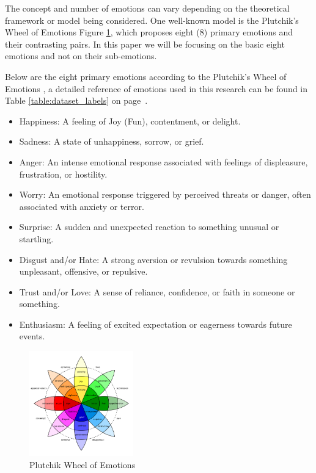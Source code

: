 \documentclass[11pt]{article}
\begin{document}
The concept and number of emotions can vary depending on the theoretical framework or model being considered. One well-known model is the Plutchik's Wheel of Emotions Figure \ref{fig:plutchik-wheel}, which proposes eight (8) primary emotions and their contrasting pairs. In this paper we will be focusing on the basic eight emotions and not on their sub-emotions.

Below are the eight primary emotions according to the Plutchik's Wheel of Emotions \cite{Tromp}, a detailed reference of emotions used in this research can be found in Table \ref{table:dataset_labels} on page~\pageref{table:dataset_labels}.

\begin{itemize}
\item Happiness: A feeling of Joy (Fun), contentment, or delight.
\item Sadness: A state of unhappiness, sorrow, or grief.
\item Anger: An intense emotional response associated with feelings of displeasure, frustration, or hostility.
\item Worry: An emotional response triggered by perceived threats or danger, often associated with anxiety or terror.
\item Surprise: A sudden and unexpected reaction to something unusual or startling.
\item Disgust and/or Hate: A strong aversion or revulsion towards something unpleasant, offensive, or repulsive.
\item Trust and/or Love: A sense of reliance, confidence, or faith in someone or something.
\item Enthusiasm: A feeling of excited expectation or eagerness towards future events.
\end{itemize}

\begin{figure}[h]
    \centering
    \includegraphics[width=0.4\textwidth]{Plutchik-Wheel}
    \caption{Plutchik Wheel of Emotions}
    \label{fig:plutchik-wheel}
\end{figure}
\end{document}
